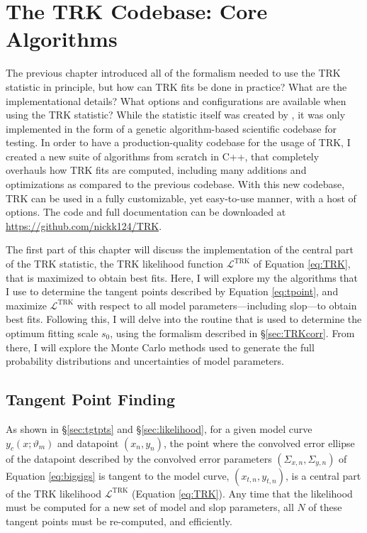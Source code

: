 \chapter{The TRK Codebase: Core Algorithms}
\label{cha:code1}
The previous chapter introduced all of the formalism needed to use the TRK statistic in principle, but how can TRK fits be done in practice? What are the implementational details? What options and configurations are available when using the TRK statistic? While the statistic itself was created by \textcite{trotter}, it was only implemented in the form of a genetic algorithm-based scientific codebase for testing. In order to have a production-quality codebase for the usage of TRK, I created a new suite of algorithms from scratch in C++, that completely overhauls how TRK fits are computed, including many additions and optimizations as compared to the previous codebase. With this new codebase, TRK can be used in a fully customizable, yet easy-to-use manner, with a host of options. The code and full documentation can be downloaded at \url{https://github.com/nickk124/TRK}.

The first part of this chapter will discuss the implementation of the central part of the TRK statistic, the TRK likelihood function $\mathcal{L}^\text{TRK}$ of Equation \eqref{eq:TRK}, that is maximized to obtain best fits. Here, I will explore my the algorithms that I use to determine the tangent points described by Equation \eqref{eq:tpoint}, and maximize $\mathcal{L}^\text{TRK}$ with respect to all model parameters---including slop---to obtain best fits. Following this, I will delve into the routine that is used to determine the optimum fitting scale $s_0$, using the formalism described in \S\ref{sec:TRKcorr}. From there, I will explore the Monte Carlo methods used to generate the full probability distributions and uncertainties of model parameters.

\section{Tangent Point Finding}
\label{sec:tgtfinder}
As shown in \S\ref{sec:tgtpts} and \S\ref{sec:likelihood}, for a given model curve $y_c(x;\vartheta_m)$ and datapoint $(x_n,y_n)$, the point where the convolved error ellipse of the datapoint described by the convolved error parameters $(\Sigma_{x,n}, \Sigma_{y,n})$ of Equation \eqref{eq:bigsigs} is tangent to the model curve, $(x_{t,n},y_{t,n})$, is a central part of the TRK likelihood $\mathcal{L}^\text{TRK}$ (Equation \eqref{eq:TRK}). Any time that the likelihood must be computed for a new set of model and slop parameters, all $N$ of these tangent points must be re-computed, and efficiently.

